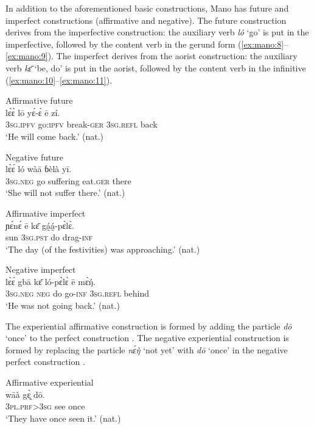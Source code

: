 \documentclass[output=paper,colorlinks,citecolor=brown]{langscibook}
\begin{document}
In addition to the aforementioned basic constructions, Mano has future and imperfect constructions (affirmative and negative). The future construction derives from the imperfective construction: the auxiliary verb \textit{ló} ‘go’ is put in the imperfective, followed by the content verb in the gerund form (\ref{ex:mano:8}--\ref{ex:mano:9}). The imperfect derives from the aorist construction: the auxiliary verb \textit{kɛ̄ } ‘be, do’ is put in the aorist, followed by the content verb in the infinitive (\ref{ex:mano:10}--\ref{ex:mano:11}). 

\ea\label{ex:mano:8}Affirmative future\\
    \gll lɛ́ɛ̀ lō yɛ́-ɛ̀ ē zí.   \\
         3\textsc{sg.ipfv} go:\textsc{ipfv} break-\textsc{ger} \textsc{3sg.refl} back   \\
    \glt \textsc{‘}He will come back.’ (nat.)
\z


\ea\label{ex:mano:9}Negative future\\
    \gll lɛ̀ɛ́ ló wàā ɓèlà yī.   \\
    3\textsc{sg.neg} go suffering eat.\textsc{ger} there \\
    \glt ‘She will not suffer there.’ (nat.)
\z


\ea\label{ex:mano:10}Affirmative imperfect\\
    \gll ɲɛ́nɛ́ ē kɛ̄ gá̰á̰-pɛ̀lɛ̀.\\
     sun 3\textsc{sg.pst} do drag-\textsc{inf}    \\
    \glt ‘The day (of the festivities) was approaching.’ (nat.)
\z


\ea\label{ex:mano:11}Negative imperfect\\
    \gll lɛ̀ɛ́ gbā kɛ̄ ló-pɛ̀lɛ̀ ē mɛ̀ŋ́. \\
         3\textsc{sg.neg} \textsc{neg} do go-\textsc{inf} \textsc{3sg.refl} behind  \\
    \glt ‘He was not going back.’ (nat.)
\z

The experiential affirmative construction is formed by adding the particle \textit{dō} ‘once’ to the perfect construction . The negative experiential construction is formed by replacing the particle \textit{nɛ́ŋ̀ } ‘not yet’ with \textit{dō} ‘once’ in the negative perfect construction .

\ea\label{ex:mano:12}Affirmative experiential\\
    \gll wāà gɛ̰̀ dō.     \\
         \textsc{3pl.prf>3sg} see once     \\
    \glt ‘They have once seen it.’ (nat.)
\z
\end{document}
